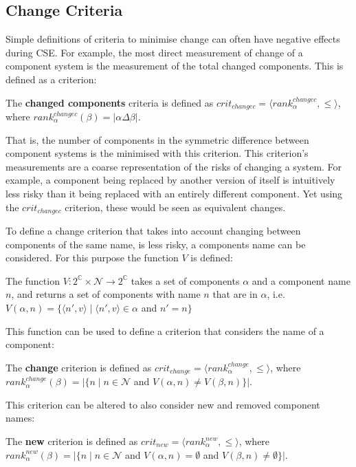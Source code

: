 \subsection{Change Criteria}
Simple definitions of criteria to minimise change can often have negative effects during CSE.
For example, the most direct measurement of change of a component system is the measurement of the total changed components.
This is defined as a \modelname criterion:
\begin{defs}
	The \textbf{changed components} criteria is defined as $crit_{changec} = \langle rank^{changec}_{\alpha}, \leq \rangle$,
	where $rank^{changec}_{\alpha}(\beta) = |\alpha \Delta \beta|$.
\end{defs}
That is, the number of components in the symmetric difference between component systems is the minimised with this criterion.
This criterion's measurements are a coarse representation of the risks of changing a system.
For example, a component being replaced by another version of itself is intuitively less risky than it being replaced with an entirely different component.  
Yet using the $crit_{changec}$ criterion, these would be seen as equivalent changes.

To define a change criterion that takes into account changing between components of the same name, is less risky, a components name can be considered.
For this purpose the function $V$ is defined:
\begin{defs}
The function $V: 2^{\mathbb{C}} \times \mathcal{N} \rightarrow 2^{\mathbb{C}}$ takes a set of components $\alpha$ and a component name $n$, and returns a set of components with name $n$ that are in $\alpha$,
i.e. $V(\alpha,n) = \{\langle n',v \rangle \mid \langle n',v \rangle \in \alpha $ and $ n' = n \}$
\end{defs}

This function can be used to define a criterion that considers the name of a component:
\begin{defs}
	The \textbf{change} criterion is defined as $crit_{change} = \langle rank^{change}_{\alpha}, \leq \rangle$,
	where $rank^{change}_{\alpha}(\beta) = |\{n \mid n \in \mathcal{N}$ and $V(\alpha,n) \neq V(\beta,n) \}|$.
\end{defs}

This criterion can be altered to also consider new and removed component names:
\begin{defs}
	The \textbf{new} criterion is defined as $crit_{new} = \langle rank^{new}_{\alpha}, \leq \rangle$,
	where $rank^{new}_{\alpha}(\beta) = |\{n \mid n \in \mathcal{N}$ and $V(\alpha,n) = \emptyset$ and $V(\beta,n) \neq \emptyset\}|$.
\end{defs}

